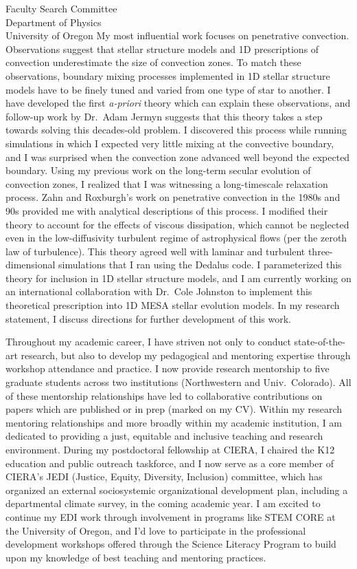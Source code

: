 \documentclass[11pt]{letter}
\begin{document}
\begin{letter}{
               Faculty Search Committee \\
               Department of Physics \\
               University of Oregon
           }
    My most influential work focuses on penetrative convection.
    Observations suggest that stellar structure models and 1D prescriptions of convection underestimate the size of convection zones.
    To match these observations, boundary mixing processes implemented in 1D stellar structure models have to be finely tuned and varied from one type of star to another.
    I have developed the first \emph{a-priori} theory which can explain these observations, and follow-up work by Dr.~Adam Jermyn suggests that this theory takes a step towards solving this decades-old problem.
    I discovered this process while running simulations in which I expected very little mixing at the convective boundary, and I was surprised when the convection zone advanced well beyond the expected boundary.
    Using my previous work on the long-term secular evolution of convection zones, I realized that I was witnessing a long-timescale relaxation process.
    Zahn and Roxburgh's work on penetrative convection in the 1980s and 90s provided me with analytical descriptions of this process.
    I modified their theory to account for the effects of viscous dissipation, which cannot be neglected even in the low-diffusivity turbulent regime of astrophysical flows (per the zeroth law of turbulence).
    This theory agreed well with laminar and turbulent three-dimensional simulations that I ran using the Dedalus code.
    I parameterized this theory for inclusion in 1D stellar structure models, and I am currently working on an international collaboration with Dr.~Cole Johnston to implement this theoretical prescription into 1D MESA stellar evolution models.
    In my research statement, I discuss directions for further development of this work.

    Throughout my academic career, I have striven not only to conduct state-of-the-art research, but also to develop my pedagogical and mentoring expertise through workshop attendance and practice.
    I now provide research mentorship to five graduate students across two institutions (Northwestern and Univ.~Colorado).
    All of these mentorship relationships have led to collaborative contributions on papers which are published or in prep (marked on my CV).
    Within my research mentoring relationships and more broadly within my academic institution, I am dedicated to providing a just, equitable and inclusive teaching and research environment.
    During my postdoctoral fellowship at CIERA, I chaired the K12 education and public outreach taskforce, and I now serve as a core member of CIERA's JEDI (Justice, Equity, Diversity, Inclusion) committee, which has organized an external sociosystemic organizational development plan, including a departmental climate survey, in the coming academic year.
    I am excited to continue my EDI work through involvement in programs like STEM CORE at the University of Oregon, and I'd love to participate in the professional development workshops offered through the Science Literacy Program to build upon my knowledge of best teaching and mentoring practices.


\end{letter}
\end{document}
